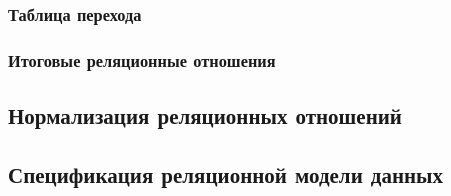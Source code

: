 \documentclass[10pt, a4paper, titlepage]{article}
\begin{document}
{    \newcommand\ruleOneMondatoryManyMondatoryNum{4}
    \newcommand\ruleOneMondatoryManyMondatory{1 Об - М Об}
    \newcommand\ruleManyMondatoryOneMondatoryNum{4}
    \newcommand\ruleManyMondatoryOneMondatory{М Об - 1 Об}
    
    \newcommand\ruleOneMondatoryManyOptionalNum{5}
    \newcommand\ruleOneMondatoryManyOptional{1 Об - М Н/О}
    \newcommand\ruleManyOptionalOneMondatoryNum{5}
    \newcommand\ruleManyOptionalOneMondatory{М Н/О - 1 Об}
    
    \newcommand\ruleOneOptionalManyOptionalNum{5}
    \newcommand\ruleOneOptionalManyOptional{1 Н/О - М Н/О}
    \newcommand\ruleManyOptionalOneOptionalNum{5}
    \newcommand\ruleManyOptionalOneOptional{М Н/О - 1 Н/О}
    
    \newcommand\ruleManyOptionalManyOptionalNum{6}
    \newcommand\ruleManyOptionalManyOptional{М Н/О - М Н/О}
    
    
    \subsubsection{Таблица перехода}
    
    
    
    
    
    
    \subsubsection{Итоговые реляционные отношения}
    
    
    
    
}

\subsection{Нормализация реляционных отношений}



\subsection{Спецификация реляционной модели данных}
\end{document}
